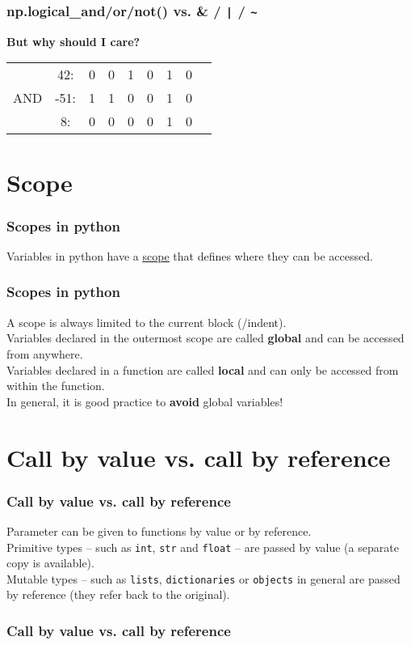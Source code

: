 \documentclass{beamer}
\newcommand{\hrefu}[2]{\underline{\href{#1}{#2}}}
\begin{document}
\begin{frame}
  \frametitle{np.logical\_and/or/not() vs. \& / \texttt{|} / \texttt{\~{}} }
  \textbf{But why should I care?}
  
  \vspace{5mm}
  \begin{tabular}{c c c c c c c c c }
    &42: & 0 & 0 & 1 & 0 & 1 & 0 \\ 
    AND&-51:& 1 & 1 & 0 & 0 & 1 & 0 \\\hline
    &8:  & 0 & 0 & 0 & 0 & 1 & 0 \\
  \end{tabular}
\end{frame}

\section{Scope}
\begin{frame}
  \frametitle{Scopes in python}
  Variables in python have a \hrefu{https://www.w3schools.com/python/python_scope.asp}{scope} that defines where they can be accessed.\\
  
\end{frame}
\begin{frame}
  \frametitle{Scopes in python}
  A scope is always limited to the current block (/indent).\\
  Variables declared in the outermost scope are called \textbf{global} and can be accessed from anywhere.\\
  \vspace{5mm}
  Variables declared in a function are called \textbf{local} and can only be accessed from within the function.\\
  \vspace{5mm}
  In general, it is good practice to \textbf{avoid} global variables!
\end{frame}
\section{Call by value vs. call by reference}
\begin{frame}
  \frametitle{Call by value vs. call by reference}
  Parameter can be given to functions by value or by reference.\\
  \vspace{5mm}
  Primitive types -- such as \texttt{int}, \texttt{str} and \texttt{float} -- are passed by value (a separate copy is available).\\
  \vspace{5mm}
  Mutable types -- such as \texttt{lists}, \texttt{dictionaries} or \texttt{objects} in general are passed by reference (they refer back to the original). 
\end{frame}
\begin{frame}
  \frametitle{Call by value vs. call by reference}
  
\end{frame}
\end{document}
